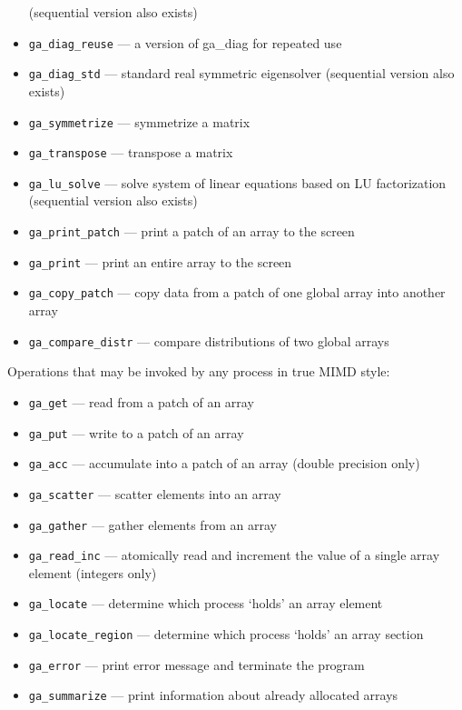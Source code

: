 \begin{itemize}
  (sequential version also exists)
\item {\tt ga\_diag\_reuse} --- a version of ga\_diag for repeated use
\item {\tt ga\_diag\_std} --- standard real symmetric eigensolver
  (sequential version also exists)
\item {\tt ga\_symmetrize} --- symmetrize a matrix
\item {\tt ga\_transpose} --- transpose a matrix
\item {\tt ga\_lu\_solve} --- solve system of linear equations based
  on LU factorization (sequential version also exists)
\item {\tt ga\_print\_patch} --- print a patch of an array to the
  screen
\item {\tt ga\_print} --- print an entire array to the screen
\item {\tt ga\_copy\_patch} --- copy data from a patch of one global
  array into another array
\item {\tt ga\_compare\_distr} --- compare distributions of two global
  arrays
\end{itemize}

Operations that may be invoked by any process in true MIMD style:
\begin{itemize}
\item {\tt ga\_get} --- read from a patch of an array
\item {\tt ga\_put} --- write to a patch of an array
\item {\tt ga\_acc} --- accumulate into a patch of an array (double
  precision only)
\item {\tt ga\_scatter} --- scatter elements into an array
\item {\tt ga\_gather} --- gather elements from an array
\item {\tt ga\_read\_inc} --- atomically read and increment the value
  of a single array element (integers only)
\item {\tt ga\_locate} --- determine which process `holds' an array
  element
\item {\tt ga\_locate\_region} --- determine which process `holds' an
  array section
\item {\tt ga\_error} --- print error message and terminate the
  program
\item {\tt ga\_summarize} --- print information about already
  allocated arrays
\end{itemize}


